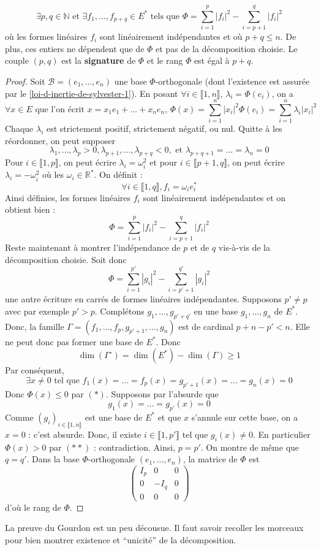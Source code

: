 	\begin{theorem}
		\[ \exists p, q \in \mathbb{N} \text{ et } \exists f_1, \dots, f_{p+q} \in E^* \text{ tels que } \Phi = \sum_{i=1}^p |f_i|^2 - \sum_{i=p+1}^q |f_i|^2 \]
		où les formes linéaires $f_i$ sont linéairement indépendantes et où $p + q \leq n$. De plus, ces entiers ne dépendent que de $\Phi$ et pas de la décomposition choisie.
		\newpar
		Le couple $(p,q)$ est la \textbf{signature} de $\Phi$ et le rang $\Phi$ est égal à $p+q$.
	\end{theorem}

	\begin{proof}
		Soit $\mathcal{B} = (e_1, \dots, e_n)$ une base $\Phi$-orthogonale (dont l'existence est assurée par le \cref{loi-d-inertie-de-sylvester-1}). En posant $\forall i \in \llbracket 1, n \rrbracket$, $\lambda_i = \Phi(e_i)$, on a
		\[ \forall x \in E \text{ que l'on écrit } x = x_1 e_1 + \dots + x_n e_n, \, \Phi(x) = \sum_{i=1}^n |x_i|^2 \Phi(e_i) = \sum_{i=1}^n \lambda_i |x_i|^2 \]
		Chaque $\lambda_i$ est strictement positif, strictement négatif, ou nul. Quitte à les réordonner, on peut supposer
		\[ \lambda_1, \dots, \lambda_p > 0, \lambda_{p+1}, \dots, \lambda_{p+q} < 0, \text{ et } \lambda_{p+q+1} = \dots = \lambda_n = 0 \]
		Pour $i \in \llbracket 1, p \rrbracket$, on peut écrire $\lambda_i = \omega_i^2$ et pour $i \in \llbracket p+1, q \rrbracket$, on peut écrire $\lambda_i = -\omega_i^2$ où les $\omega_i \in \mathbb{R}^*$. On définit :
		\[ \forall i \in \llbracket 1, q \rrbracket, f_i = \omega_i e_i^* \]
		Ainsi définies, les formes linéaires $f_i$ sont linéairement indépendantes et on obtient bien :
		\[ \Phi = \sum_{i=1}^p |f_i|^2 - \sum_{i=p+1}^q |f_i|^2 \tag{$*$} \]
		Reste maintenant à montrer l'indépendance de $p$ et de $q$ vis-à-vis de la décomposition choisie. Soit donc
		\[ \Phi = \sum_{i=1}^{p'} |g_i|^2 - \sum_{i=p'+1}^{q'} |g_i|^2 \tag{$**$} \]
		une autre écriture en carrés de formes linéaires indépendantes. Supposons $p' \neq p$ avec par exemple $p' > p$. Complétons $g_1, \dots, g_{p'+q'}$ en une base $g_1, \dots, g_n$ de $E^*$. Donc, la famille $\Gamma = (f_1, \dots, f_p, g_{p'+1}, \dots, g_n)$ est de cardinal $p + n - p' < n$. Elle ne peut donc pas former une base de $E^*$. Donc
		\[ \dim(\Gamma^\circ) = \dim(E^*) - \dim(\Gamma) \geq 1 \]
		Par conséquent,
		\[ \exists x \neq 0 \text{ tel que } f_1(x) = \dots = f_p(x) = g_{p'+1}(x) = \dots = g_n(x) = 0 \]
		Donc $\Phi(x) \leq 0$ par $(*)$. Supposons par l'absurde que
		\[ g_1(x) = \dots = g_{p'}(x) = 0 \]
		Comme $(g_i)_{i \in \llbracket 1, n \rrbracket}$ est une base de $E^*$ et que $x$ s'annule sur cette base, on a $x = 0$ : c'est absurde. Donc, il existe $i \in \llbracket 1, p' \rrbracket$ tel que $g_i(x) \neq 0$. En particulier $\Phi(x) > 0$ par $(**)$ : contradiction. Ainsi, $p = p'$. On montre de même que $q = q'$.
		\newpar
		Dans la base $\Phi$-orthogonale $(e_1, \dots, e_n)$, la matrice de $\Phi$ est
		\[ \begin{pmatrix}
			I_p & 0 & 0 \\
			0 & -I_q & 0 \\
			0 & 0 & 0
		\end{pmatrix} \]
		d'où le rang de $\Phi$.
	\end{proof}

	\begin{remark}
		La preuve du Gourdon est un peu décousue. Il faut savoir recoller les morceaux pour bien montrer existence et ``unicité'' de la décomposition.
	\end{remark}

